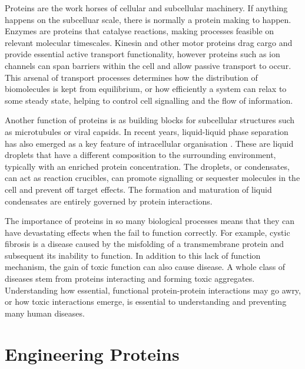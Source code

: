 Proteins are the work horses of cellular and subcellular machinery. If anything happens on the subcelluar scale, there is normally a protein making to happen. Enzymes are proteins that catalyse reactions, making processes feasible on relevant molecular timescales. \cite{alberts_molecular_2008} Kinesin and other motor proteins drag cargo and provide essential active transport functionality, \cite{hirokawa_molecular_2010} however proteins such as ion channels can span barriers within the cell and allow passive transport to occur. \cite{berg_biochemistry_2002} This arsenal of transport processes determines how the distribution of biomolecules is kept from equilibrium, or how efficiently a system can relax to some steady state, helping to control cell signalling and the flow of information.

Another function of proteins is as building blocks for subcellular structures such as microtubules or viral capsids. \cite{keskin_principles_2008} In recent years, liquid-liquid phase separation has also emerged as a key feature of intracellular organisation \cite{shin, banani_biomolecular_2017}. These are liquid droplets that have a different composition to the surrounding environment, typically with an enriched protein concentration. The droplets, or condensates, can act as reaction crucibles, can promote signalling or sequester molecules in the cell and prevent off target effects. \cite{shin_liquid_2017} The formation and maturation of liquid condensates are entirely governed by protein interactions.

The importance of proteins in so many biological processes means that they can have devastating effects when the fail to function correctly. For example, cystic fibrosis is a disease caused by the misfolding of a transmembrane protein and subsequent its inability to function. \cite{luheshi_protein_2008} In addition to this lack of function mechanism, the gain of toxic function can also cause disease. \cite{dobson_protein_2003} A whole class of diseases stem from proteins interacting and forming toxic aggregates. \cite{chiti_protein_2006, chiti_protein_2017} Understanding how essential, functional protein-protein interactions may go awry, or how toxic interactions emerge, is essential to understanding and preventing many human diseases.

\section{Engineering Proteins}

